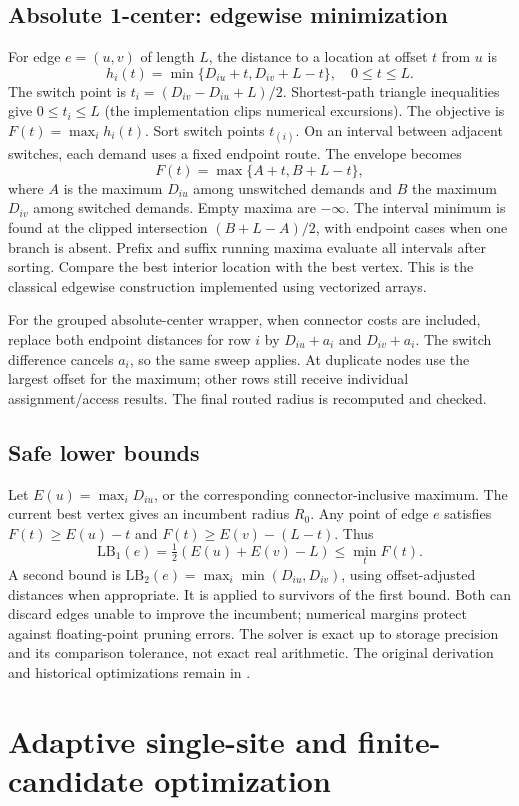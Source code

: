 \documentclass[11pt,a4paper]{article}
\newcommand{\code}[1]{\texttt{\detokenize{#1}}}
\begin{document}
\subsection{Absolute 1-center: edgewise minimization}
For edge $e=(u,v)$ of length $L$, the distance to a location at offset $t$ from $u$ is
\[
 h_i(t)=\min\{D_{iu}+t,D_{iv}+L-t\},\quad 0\le t\le L.
\]
The switch point is $t_i=(D_{iv}-D_{iu}+L)/2$. Shortest-path triangle inequalities give $0\le t_i\le L$ (the implementation clips numerical excursions). The objective is $F(t)=\max_i h_i(t)$. Sort switch points $t_{(i)}$. On an interval between adjacent switches, each demand uses a fixed endpoint route. The envelope becomes
\[
 F(t)=\max\{A+t,B+L-t\},
\]
where $A$ is the maximum $D_{iu}$ among unswitched demands and $B$ the maximum $D_{iv}$ among switched demands. Empty maxima are $-\infty$. The interval minimum is found at the clipped intersection $(B+L-A)/2$, with endpoint cases when one branch is absent. Prefix and suffix running maxima evaluate all intervals after sorting. Compare the best interior location with the best vertex. This is the classical edgewise construction \cite{kariv,handler} implemented using vectorized arrays.

For the grouped absolute-center wrapper, when connector costs are included, replace both endpoint distances for row $i$ by $D_{iu}+a_i$ and $D_{iv}+a_i$. The switch difference cancels $a_i$, so the same sweep applies. At duplicate nodes use the largest offset for the maximum; other rows still receive individual assignment/access results. The final routed radius is recomputed and checked.
\subsection{Safe lower bounds}
Let $E(u)=\max_i D_{iu}$, or the corresponding connector-inclusive maximum. The current best vertex gives an incumbent radius $R_0$. Any point of edge $e$ satisfies $F(t)\ge E(u)-t$ and $F(t)\ge E(v)-(L-t)$. Thus
\[
 \mathrm{LB}_1(e)=\tfrac12(E(u)+E(v)-L)\le\min_t F(t).
\]
A second bound is $\mathrm{LB}_2(e)=\max_i\min(D_{iu},D_{iv})$, using offset-adjusted distances when appropriate. It is applied to survivors of the first bound. Both can discard edges unable to improve the incumbent; numerical margins protect against floating-point pruning errors. The solver is exact up to storage precision and its comparison tolerance, not exact real arithmetic. The original derivation and historical optimizations remain in \code{docs/ALGORITHMS.md}.
\section{Adaptive single-site and finite-candidate optimization}
\end{document}
